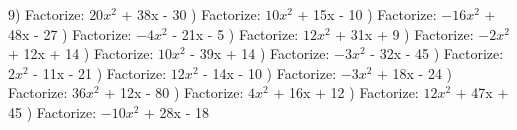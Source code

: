 \documentclass{article}%
\begin{document}
9) Factorize: $20x^2$ + 38x - 30%
\newline%
\newline%
) Factorize: $10x^2$ + 15x - 10%
\newline%
\newline%
) Factorize: $-16x^2$ + 48x - 27%
\newline%
\newline%
) Factorize: $-4x^2$ - 21x - 5%
\newline%
\newline%
) Factorize: $12x^2$ + 31x + 9%
\newline%
\newline%
) Factorize: $-2x^2$ + 12x + 14%
\newline%
\newline%
) Factorize: $10x^2$ - 39x + 14%
\newline%
\newline%
) Factorize: $-3x^2$ - 32x - 45%
\newline%
\newline%
) Factorize: $2x^2$ - 11x - 21%
\newline%
\newline%
) Factorize: $12x^2$ - 14x - 10%
\newline%
\newline%
) Factorize: $-3x^2$ + 18x - 24%
\newline%
\newline%
) Factorize: $36x^2$ + 12x - 80%
\newline%
\newline%
) Factorize: $4x^2$ + 16x + 12%
\newline%
\newline%
) Factorize: $12x^2$ + 47x + 45%
\newline%
\newline%
) Factorize: $-10x^2$ + 28x - 18%
\end{document}
